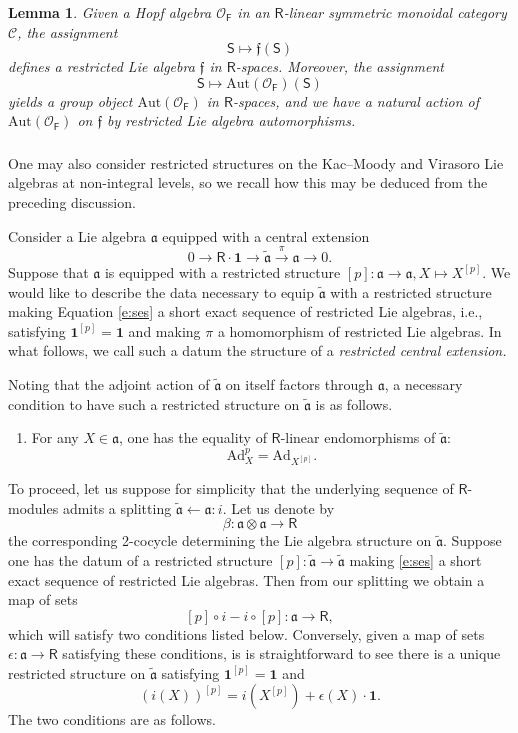\documentclass{amsart}
\newtheorem{Lem}[Thm]{Lemma}
\theoremstyle{definition}
\newcommand{\OOF}{\OO_{\mathsf{F}}}
\newcommand{\fa}{\mathfrak{a}}
\newcommand{\sC}{\mathscr{C}}
\newcommand{\sss}{\subsubsection{}}
\newcommand{\Sing}{\mathsf{S}}
\newcommand{\OO}{\mathscr{O}}
\newcommand{\on}{\mathrm}
\newcommand{\Ring}{\mathsf{R}}
\newcommand{\ff}{\mathfrak{f}}
\numberwithin{equation}{section}
\begin{document}
\begin{Lem} \label{l:count}Given a Hopf algebra $\OOF$ in an $\Ring$-linear symmetric monoidal category $\sC$, the assignment $$\Sing \mapsto \ff(\Sing)$$defines a restricted Lie algebra $\ff$ in $\Ring$-spaces. Moreover, the assignment $$\Sing \mapsto \on{Aut}(\OOF)(\Sing)$$yields a group object $\on{Aut}(\OOF)$ in $\Ring$-spaces, and we have a natural action of $\on{Aut}(\OOF)$ on $\ff$ by restricted Lie algebra automorphisms. 
\end{Lem}
\fi 






\iffalse 
\sss One may also consider restricted structures on the Kac--Moody and Virasoro Lie algebras at non-integral levels, so we recall how this may be deduced from the preceding discussion. 

Consider a Lie algebra $\fa$ equipped with a central extension \begin{equation} \label{e:ses}0 \rightarrow \Ring \cdot \mathbf{1} \rightarrow \widetilde{\fa} \xrightarrow{\pi} \fa \rightarrow 0.\end{equation}Suppose that $\fa$ is equipped with a restricted structure $[p]: \fa \rightarrow \fa, X \mapsto X^{[p]}$. We would like to describe the data necessary to equip $\widetilde{\fa}$ with a restricted structure making Equation \eqref{e:ses} a short exact sequence of restricted Lie algebras, i.e., satisfying $\mathbf{1}^{[p]} = \mathbf{1}$ and making $\pi$ a homomorphism of restricted Lie algebras. In what follows, we call such a datum the structure of a {\em restricted central extension.}

Noting that the adjoint action of $\widetilde{\fa}$ on itself factors through $\fa$, a necessary condition to have such a restricted structure on $\widetilde{\fa}$ is as follows.
\begin{enumerate}
\item For any $X \in \fa$, one has the equality of $\Ring$-linear endomorphisms of $\widetilde{\fa}$: $$\on{Ad}_X^p = \on{Ad}_{X^{[p]}}.$$
\end{enumerate}
To proceed, let us suppose for simplicity that the underlying sequence of $\Ring$-modules admits a splitting $\widetilde{\fa} \leftarrow \fa: i$. Let us denote by $$\beta: \fa \otimes \fa \rightarrow \Ring$$ the corresponding 2-cocycle determining the Lie algebra structure on $\widetilde{\fa}$. 
Suppose one has the datum of a restricted structure $[p]: \widetilde{\fa} \rightarrow \widetilde{\fa}$ making \eqref{e:ses} a short exact sequence of restricted Lie algebras. Then from our splitting we obtain a map of sets
$$[p] \circ i - i \circ [p]: \fa \rightarrow \Ring,$$
which will satisfy two conditions listed below. Conversely, given a map of sets $\epsilon: \fa \rightarrow \Ring$ satisfying these conditions, is is straightforward to see there is a unique restricted structure on $\widetilde{\fa}$ satisfying $\mathbf{1}^{[p]} = \mathbf{1}$ and 
$$(i(X))^{[p]} = i(X^{[p]}) + \epsilon(X) \cdot \mathbf{1}.$$
The two conditions are as follows. 
\end{document}
